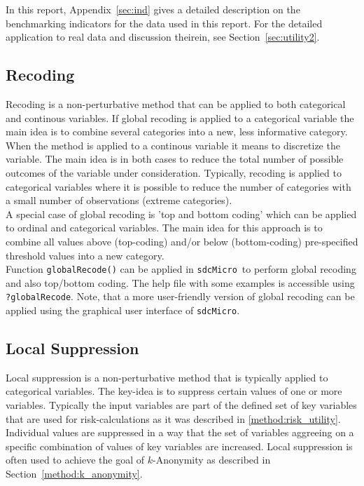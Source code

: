 \documentclass[12pt]{article}
\newcommand{\sdcMicro}{\texttt{sdcMicro}}
\begin{document}
In this report, Appendix~\ref{sec:ind} gives a detailed description on the benchmarking indicators 
for the data used in this report. For the detailed application to real data and discussion theirein, 
see Section~\ref{sec:utility2}.



\subsection{Recoding}\label{method:recoding}
Recoding is a non-perturbative method that can be applied to both categorical and continous variables. If global recoding is applied to a categorical variable the main idea is to combine several categories into a new, less informative category. When the method is applied to a continous variable it means to discretize the variable. The main idea is in both cases to reduce the total number of possible outcomes of the variable under consideration. Typically, recoding is applied to categorical variables where it is possible to reduce the number of categories with a small number of observations (extreme categories). \\

A special case of global recoding is 'top and bottom coding' which can be applied to ordinal and categorical variables. The main idea for this approach is to combine all values above (top-coding) and/or below (bottom-coding) pre-specified threshold values into a new category. \\

Function \lstinline{globalRecode()} can be applied in \sdcMicro~to perform global recoding and also top/bottom coding. 
The help file with some examples is accessible using \lstinline{?globalRecode}. Note, that a more user-friendly version of global recoding 
can be applied using the graphical user interface of \sdcMicro .


\subsection{Local Suppression}\label{method:localsupp}
Local suppression is a non-perturbative method that is typically applied to categorical variables. 
The key-idea is to suppress certain values of one or more variables. 
Typically the input variables are part of the defined set of 
key variables that are used for risk-calculations as it was described in \ref{method:risk_utility}. 
Individual values are suppressed in a way that the set of variables aggreeing on a specific combination of values of 
key variables are increased. Local suppression is often used to achieve the goal of $k$-Anonymity as described in 
Section~\ref{method:k_anonymity}. \\
\end{document}

